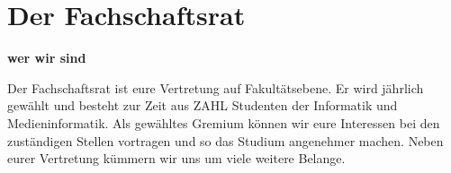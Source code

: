 \section{Der Fachschaftsrat}

\textbf{wer wir sind}

Der Fachschaftsrat ist eure Vertretung auf Fakultätsebene. Er wird jährlich gewählt und besteht zur Zeit aus ZAHL Studenten der Informatik und Medieninformatik. Als gewähltes Gremium können wir eure Interessen bei den zuständigen Stellen vortragen und so das Studium angenehmer machen. Neben eurer Vertretung kümmern wir uns um viele weitere Belange.